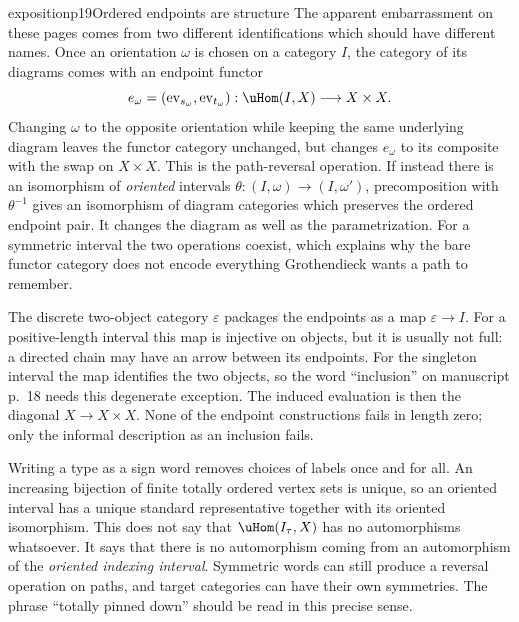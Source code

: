 \begin{dcomment}{exposition}{p19}{Ordered endpoints are structure}
The apparent embarrassment on these pages comes from two different identifications which should have different names. Once an orientation $\omega$ is chosen on a category $I$, the category of its diagrams comes with an endpoint functor
\[
e_\omega=(\operatorname{ev}_{s_\omega},\operatorname{ev}_{t_\omega})
:\uHom(I,X)\longrightarrow X\times X.
\]
Changing $\omega$ to the opposite orientation while keeping the same underlying diagram leaves the functor category unchanged, but changes $e_\omega$ to its composite with the swap on $X\times X$. This is the path-reversal operation. If instead there is an isomorphism of \emph{oriented} intervals $\theta:(I,\omega)\to(I,\omega')$, precomposition with $\theta^{-1}$ gives an isomorphism of diagram categories which preserves the ordered endpoint pair. It changes the diagram as well as the parametrization. For a symmetric interval the two operations coexist, which explains why the bare functor category does not encode everything Grothendieck wants a path to remember.

The discrete two-object category $\varepsilon$ packages the endpoints as a map $\varepsilon\to I$. For a positive-length interval this map is injective on objects, but it is usually not full: a directed chain may have an arrow between its endpoints. For the singleton interval the map identifies the two objects, so the word ``inclusion'' on manuscript p.~18 needs this degenerate exception. The induced evaluation is then the diagonal $X\to X\times X$. None of the endpoint constructions fails in length zero; only the informal description as an inclusion fails.

Writing a type as a sign word removes choices of labels once and for all. An increasing bijection of finite totally ordered vertex sets is unique, so an oriented interval has a unique standard representative together with its oriented isomorphism. This does not say that $\uHom(I_\tau,X)$ has no automorphisms whatsoever. It says that there is no automorphism coming from an automorphism of the \emph{oriented indexing interval}. Symmetric words can still produce a reversal operation on paths, and target categories can have their own symmetries. The phrase ``totally pinned down'' should be read in this precise sense.
\end{dcomment}

